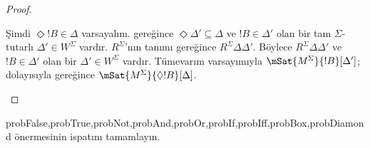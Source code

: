 \begin{proof}
\begin{enumerate}
{{{          Şimdi $\Diamond!B\in\Delta$ varsayalım.
           gereğince
          $\Diamond\Delta'\subseteq\Delta$ ve $!B\in\Delta'$ olan bir tam
          $\Sigma$-tutarlı $\Delta'\in W^\Sigma$ vardır.
           $R^\Sigma$'nın tanımı
          gereğince $R^\Sigma\Delta\Delta'$. Böylece
          $R^\Sigma\Delta\Delta'$ ve $!B\in\Delta'$ olan bir
          $\Delta'\in W^\Sigma$ vardır. Tümevarım varsayımıyla
          $\mSat{M^\Sigma}{!B}[\Delta']$; dolayısıyla
           gereğince
          $\mSat{M^\Sigma}{\Diamond!B}[\Delta]$.}}}{}
  \end{enumerate}
\end{proof}

\begin{probtag}{probFalse,probTrue,probNot,probAnd,probOr,probIf,probIff,probBox,probDiamond}
   önermesinin ispatını tamamlayın.
\end{probtag}

